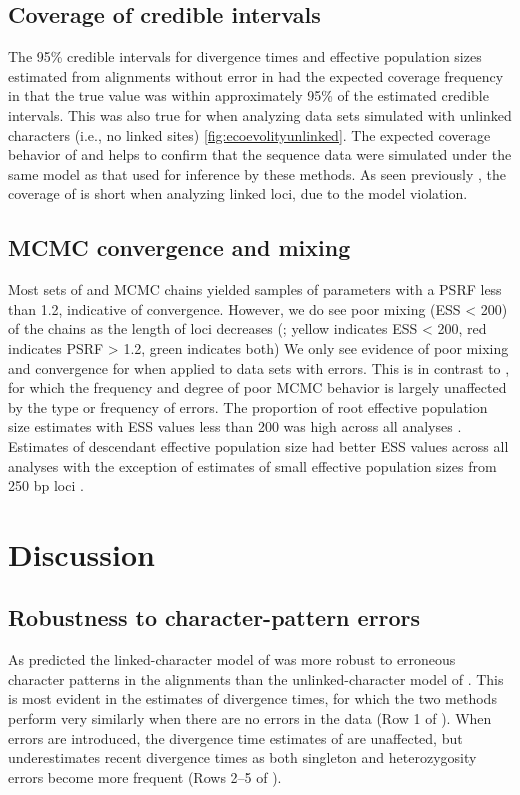 \subsection{Coverage of credible intervals}
The 95\% credible intervals for divergence times and effective population sizes
estimated from alignments without error in \beast had the expected coverage
frequency in that the true value was within approximately 95\% of the estimated
credible intervals. 
This was also true for \ecoevolity when analyzing data sets simulated with
unlinked characters (i.e., no linked sites) \cref{fig:ecoevolityunlinked}.
The expected coverage behavior of \beast and \ecoevolity helps to confirm that
the sequence data were simulated under the same model as that used for
inference by these methods. 
As seen previously \citep{Oaks2018ecoevolity}, the coverage of \ecoevolity is
short when analyzing linked loci, due to the model violation.

\subsection{MCMC convergence and mixing}
Most sets of \beast and \ecoevolity MCMC chains yielded samples of parameters with
a PSRF less than 1.2, indicative of convergence.
However, we do see poor mixing (ESS < 200) of the \beast chains as the length
of loci decreases (\mainfigs;
yellow indicates ESS < 200, red indicates PSRF > 1.2, green indicates both)
We only see evidence of poor mixing and convergence for \ecoevolity when
applied to data sets with errors.
This is in contrast to \beast, for which the frequency and degree of poor MCMC
behavior is largely unaffected by the type or frequency of errors.
The proportion of \beast root effective population size estimates with ESS 
values less than 200 was high across all analyses \rootfigsp.
Estimates of descendant effective population size had better ESS values across all 
analyses with the exception of estimates of small effective population sizes from 
250 bp loci \thetafigsp.


\section{Discussion}



\subsection{Robustness to character-pattern errors}
As predicted the linked-character model of \beast was more robust to erroneous
character patterns in the alignments than the unlinked-character model of
\ecoevolity.
This is most evident in the estimates of divergence times, for which
the two methods perform very similarly when there are no errors in the
data (Row 1 of \timefigs).
When errors are introduced, the divergence time estimates of \beast are
unaffected, but \ecoevolity underestimates recent divergence times as both
singleton and heterozygosity errors become more frequent (Rows 2--5 of
\timefigs).

